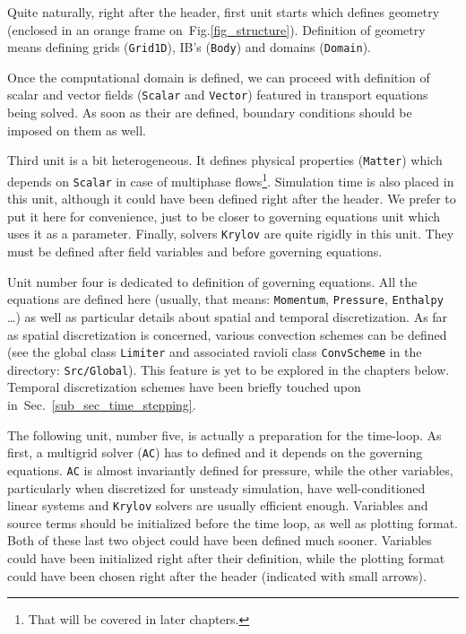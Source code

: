 Quite naturally, right after the header, first unit starts which defines 
geometry (enclosed in an orange frame on~Fig.\ref{fig_structure}). 
Definition of geometry means defining grids ({\tt Grid1D}), IB's 
({\tt Body}) and domains ({\tt Domain}). 

Once the computational domain is defined, we can proceed with definition
of scalar and vector fields ({\tt Scalar} and {\tt Vector}) featured
in transport equations being solved. As soon as their are defined,
boundary conditions should be imposed on them as well. 

Third unit is a bit heterogeneous. It defines physical properties ({\tt Matter})
which depends on {\tt Scalar} in case of multiphase flows\footnote{That will
be covered in later chapters.}. Simulation time is also placed in this unit,
although it could have been defined right after the header. We prefer to put
it here for convenience, just to be closer to governing equations unit which
uses it as a parameter. Finally, solvers {\tt Krylov} are quite rigidly in
this unit. They must be defined after field variables and before governing
equations. 

Unit number four is dedicated to definition of governing equations. All the
equations are defined here (usually, that means: {\tt Momentum}, {\tt Pressure},
{\tt Enthalpy} \dots) as well as particular details about spatial and
temporal discretization. As far as spatial discretization is concerned,
various convection schemes can be defined (see the global class {\tt Limiter}
and associated ravioli class {\tt ConvScheme} in the directory: {\tt Src/Global}).
This feature is yet to be explored in the chapters below. Temporal discretization
schemes have been briefly touched upon in~Sec.~\ref{sub_sec_time_stepping}.

The following unit, number five, is actually a preparation for the time-loop.
As first, a multigrid solver ({\tt AC}) has to defined and it depends on the governing
equations. {\tt AC} is almost invariantly defined for pressure, while the other
variables, particularly when discretized for unsteady simulation, have 
well-conditioned linear systems and {\tt Krylov} solvers are usually efficient 
enough. Variables and source terms should be initialized before the time loop,
as well as plotting format. Both of these last two object could have been
defined much sooner. Variables could have been initialized right after their
definition, while the plotting format could have been chosen right after the
header (indicated with small arrows). 

